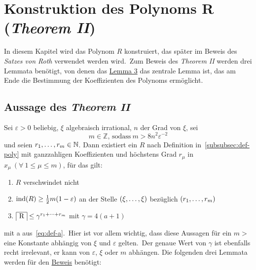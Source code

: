 
\section{Konstruktion des Polynoms R (\emph{Theorem II})}
    \label{sec:th2}
    \textrm{In diesem Kapitel wird das Polynom $R$ konstruiert, das später im Beweis des \emph{Satzes von Roth}
    verwendet werden wird.\ Zum Beweis des \emph{Theorem II} werden drei Lemmata benötigt, von denen das \hyperref
    [subsec:lemma3]{Lemma 3} das zentrale Lemma ist, das am Ende die Bestimmung der Koeffizienten des Polynoms
    ermöglicht.}
    
    \subsection{Aussage des \emph{Theorem II}}
        \label{subsec:th2}
        Sei $\varepsilon > 0$ beliebig, $\xi$ algebraisch irrational, $n$ der Grad von $\xi$, sei
        \begin{equation}
            m \in \mathbb{Z} \text{, sodass} \  m > 8 n^2 \varepsilon^{-2} \label{eq:def-m}
        \end{equation}
        \textrm{und seien $r_1, \dots, r_m \in \mathbb{N}$.
        Dann existiert ein $R$ nach Definition in~\ref{subsubsec:def-poly} mit ganzzahligen Koeffizienten und höchstens
        Grad $r_\mu$ in $x_\mu \ (\forall \ 1 \leq \mu \leq m)$, für das gilt:}
        \begin{enumerate}
            \item $R$ verschwindet nicht
            \item \textrm{$\operatorname{ind}(R) \geq \frac{1}{2} m (1 - \varepsilon)$ an der Stelle $(\xi, \dots, \xi)$ bezüglich
                $(r_1, \dots, r_m)$}
            \item $\content{R} \leq \gamma^{\dsum{r_1}{r_m}}$ mit $\gamma = 4 (a + 1)$
        \end{enumerate}
        \textrm{mit a aus~\eqref{eq:def-a}.\ Hier ist vor allem wichtig, dass diese Aussagen für ein $m >$ eine Konstante
        abhängig von $\xi$ und $\varepsilon$ gelten.\ Der genaue Wert von $\gamma$ ist ebenfalls recht irrelevant, er
        kann von $\varepsilon$, $\xi$ oder $m$ abhängen.}
        \newline \newline
        \textrm{Die folgenden drei Lemmata werden für den \hyperref[subsec:proof-th2]{Beweis} benötigt:}
    
    
    
